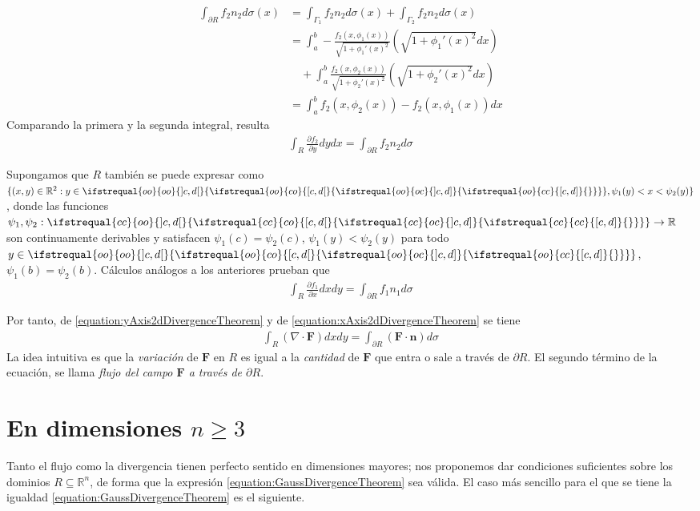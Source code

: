 \documentclass{report}
\newcommand{\realNumbers}{\mathbb{R}}
\theoremstyle{definition}
\theoremstyle{remark}
\newcommand{\leftOpenInterval}{\left]}
\newcommand{\rightOpenInterval}{\right[}
\newcommand{\leftClosedInterval}{\left[}
\newcommand{\rightClosedInterval}{\right]}
\newcommand{\interval}[3]{%
  \ifstrequal{#1}{oo}{%
    \leftOpenInterval #2, #3 \rightOpenInterval%
  }{%
    \ifstrequal{#1}{co}{%
      \leftClosedInterval #2, #3 \rightOpenInterval%
    }{%
      \ifstrequal{#1}{oc}{
        \leftOpenInterval #2, #3 \rightClosedInterval%
      }{%
        \ifstrequal{#1}{cc}{
          \leftClosedInterval #2, #3 \rightClosedInterval
        }{%
        }%
      }%
    }%
  }%
}
\begin{document}
  \begin{align}
    \int_{\partial R} f_2 n_2 d \sigma(x)
    &=
    \int_{\Gamma_1} f_2 n_2 d \sigma(x)
    + \int_{\Gamma_2} f_2 n_2 d \sigma(x)
    \\
    &=
    \int_a^b
      - \frac{f_2(x, \phi_1(x))}{\sqrt{1 + \phi_1'(x)^2}}
    \left( \sqrt{1 + \phi_1'(x)^2} d x \right)
    \\
    &\quad
      + \int_a^b
        \frac{f_2(x, \phi_2(x))}{\sqrt{1 + \phi_2'(x)^2}}
      \left( \sqrt{1 + \phi_2'(x)^2} d x \right)
    \\
    &=
    \int_a^b f_2(x, \phi_2(x)) - f_2(x, \phi_1(x)) dx
  \end{align}
  Comparando la primera y la segunda integral, resulta
  \begin{align}
    \label{equation:yAxis2dDivergenceTheorem}
    \int_R \frac{\partial f_2}{\partial y} dy dx
    =
    \int_{\partial R} f_2 n_2 d \sigma
  \end{align}

  Supongamos que \(R\) también se puede expresar como \(\{(x, y) \in \realNumbers^2 : y \in \interval{oo}{c}{d}, \psi_1(y) < x < \psi_2(y)\}\), donde las funciones \(\psi_1, \psi_2 : \interval{cc}{c}{d} \rightarrow \realNumbers\) son continuamente derivables y satisfacen \(\psi_1(c) = \psi_2(c)\), \(\psi_1(y) < \psi_2(y)\) para todo \(y \in \interval{oo}{c}{d}\), \(\psi_1(b) = \psi_2(b)\).
  Cálculos análogos a los anteriores prueban que
  \begin{align}
    \label{equation:xAxis2dDivergenceTheorem}
    \int_R \frac{\partial f_1}{\partial x} dx dy
    =
    \int_{\partial R} f_1 n_1 d \sigma
  \end{align}

  Por tanto, de \eqref{equation:yAxis2dDivergenceTheorem} y de \eqref{equation:xAxis2dDivergenceTheorem} se tiene
  \begin{align}
    \label{equation:GaussDivergenceTheorem}
    \int_R (\nabla \cdot \mathbf{F}) dx dy
    =
    \int_{\partial R} (\mathbf{F} \cdot \mathbf{n}) d \sigma
  \end{align}
  La idea intuitiva es que la \emph{variación} de \(\mathbf{F}\) en \(R\) es igual a la \emph{cantidad} de \(\mathbf{F}\) que entra o sale a través de \(\partial R\).
  El segundo término de la ecuación, se llama \emph{flujo del campo \(\mathbf{F}\) a través de \(\partial R\)}.

  \section{En dimensiones \(n \geq 3\)}
  Tanto el flujo como la divergencia tienen perfecto sentido en dimensiones mayores;
  nos proponemos dar condiciones suficientes sobre los dominios \(R \subseteq \realNumbers^n\), de forma que la expresión \eqref{equation:GaussDivergenceTheorem} sea válida.
  El caso más sencillo para el que se tiene la igualdad \eqref{equation:GaussDivergenceTheorem} es el siguiente.
\end{document}
